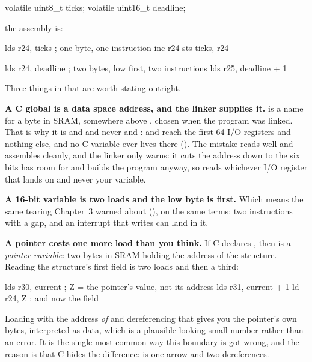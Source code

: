 \begin{ccode}
volatile uint8_t  ticks;
volatile uint16_t deadline;
\end{ccode}

the assembly is:

\begin{gnuasm}
    lds  r24, ticks             ; one byte, one instruction
    inc  r24
    sts  ticks, r24

    lds  r24, deadline          ; two bytes, low first, two instructions
    lds  r25, deadline + 1
\end{gnuasm}

Three things in that are worth stating outright.

\textbf{A C global is a data space address, and the linker supplies it.}  is a name
for a byte in SRAM, somewhere above , chosen when the program was linked. That is why
it is  and  and never  and :  and  reach
the first 64 I/O registers and nothing else, and no C variable ever lives there
(). The mistake reads well and assembles cleanly, and the linker only
warns: it cuts the address down to the six bits  has room for and builds the program
anyway, so  reads whichever I/O register that lands on and never your variable.

\textbf{A 16-bit variable is two loads and the low byte is first.} Which means the same tearing
Chapter~3 warned about (), on the same terms: two instructions with a gap,
and an interrupt that writes  can land in it.

\textbf{A pointer costs one more load than you think.} If C declares ,
then  is a \emph{pointer variable}: two bytes in SRAM holding the address of the
structure. Reading the structure's first field is two loads and then a third:

\begin{gnuasm}
    lds  r30, current           ; Z = the pointer's value, not its address
    lds  r31, current + 1
    ld   r24, Z                 ; and now the field
\end{gnuasm}

Loading  with the address \emph{of}  and dereferencing that gives you the
pointer's own bytes, interpreted as data, which is a plausible-looking small number rather than an
error. It is the single most common way this boundary is got wrong, and the reason is that C hides
the difference:  is one arrow and two dereferences.

